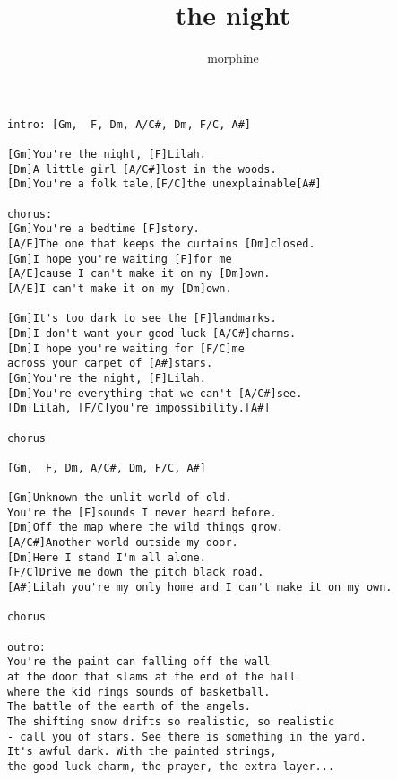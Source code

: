 \author{morphine}
\title{the night}
\maketitle
\begin{verbatim}
intro: [Gm,  F, Dm, A/C#, Dm, F/C, A#]

[Gm]You're the night, [F]Lilah.
[Dm]A little girl [A/C#]lost in the woods.
[Dm]You're a folk tale,[F/C]the unexplainable[A#]

chorus:
[Gm]You're a bedtime [F]story.
[A/E]The one that keeps the curtains [Dm]closed.
[Gm]I hope you're waiting [F]for me
[A/E]cause I can't make it on my [Dm]own.
[A/E]I can't make it on my [Dm]own.

[Gm]It's too dark to see the [F]landmarks.
[Dm]I don't want your good luck [A/C#]charms.
[Dm]I hope you're waiting for [F/C]me
across your carpet of [A#]stars.
[Gm]You're the night, [F]Lilah.
[Dm]You're everything that we can't [A/C#]see.
[Dm]Lilah, [F/C]you're impossibility.[A#]

chorus

[Gm,  F, Dm, A/C#, Dm, F/C, A#]

[Gm]Unknown the unlit world of old.
You're the [F]sounds I never heard before.
[Dm]Off the map where the wild things grow.
[A/C#]Another world outside my door.
[Dm]Here I stand I'm all alone.
[F/C]Drive me down the pitch black road.
[A#]Lilah you're my only home and I can't make it on my own.

chorus

outro:
You're the paint can falling off the wall
at the door that slams at the end of the hall
where the kid rings sounds of basketball.
The battle of the earth of the angels.
The shifting snow drifts so realistic, so realistic
- call you of stars. See there is something in the yard.
It's awful dark. With the painted strings,
the good luck charm, the prayer, the extra layer...
\end{verbatim}
